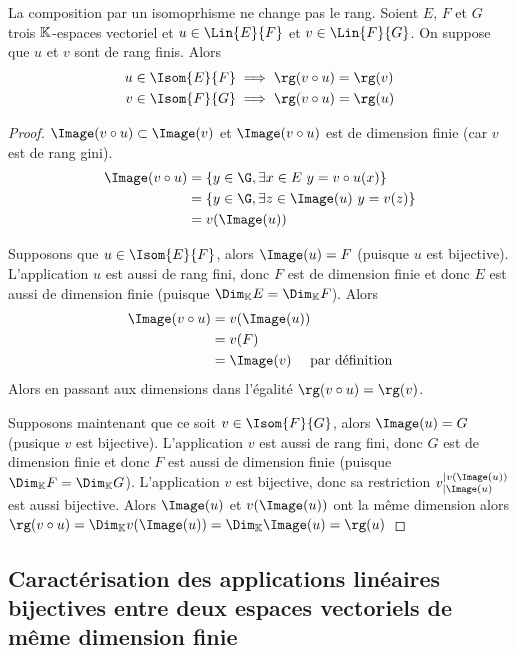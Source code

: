 \begin{theo}
  La composition par un isomoprhisme ne change pas le rang. Soient $E$, $F$ et $G$ trois $\mathbb{K}$-espaces vectoriel et $u \in \Lin{E}{F}$ et $v\in \Lin{F}{G}$. On suppose que $u$ et $v$ sont de rang finis. Alors
  \begin{align}
    u \in \Isom{E}{F} &\implies \rg(v \circ u)=\rg(v) \\
    v \in \Isom{F}{G} &\implies \rg(v \circ u)=\rg(u)
  \end{align}
\end{theo}
\begin{proof}
  $\Image(v \circ u) \subset \Image(v)$ et $\Image(v \circ u)$ est de dimension finie (car $v$ est de rang gini).
  \begin{align}
    \Image(v \circ u) &= \{y \in \G, \exists x \in E \ y=v \circ u(x) \}\\
    &=\{y \in \G, \exists z \in \Image(u) \ y=v(z)\}\\
    &=v(\Image(u))
  \end{align}

  Supposons que $u \in \Isom{E}{F}$, alors $\Image(u) = F$ (puisque $u$ est bijective). L'application $u$ est aussi de rang fini, donc $F$ est de dimension finie et donc $E$ est aussi de dimension finie (puisque $\Dim_\K E = \Dim_\K F$). Alors
  \begin{align}
    \Image(v \circ u) &= v(\Image(u)) \\
    &=v(F) \\
    &=\Image(v) \quad \text{~par définition}
  \end{align}
  Alors en passant aux dimensions dans l'égalité $\rg(v \circ u) = \rg(v)$.

  Supposons maintenant que ce soit $v \in \Isom{F}{G}$, alors $\Image(u) = G$ (pusique $v$ est bijective).  L'application $v$ est aussi de rang fini, donc $G$ est de dimension finie et donc $F$ est aussi de dimension finie (puisque $\Dim_\K F = \Dim_\K G$). L'application $v$ est bijective, donc sa restriction $v_{|\Image(u)}^{|v(\Image(u))}$ est aussi bijective. Alors $\Image(u)$ et $v(\Image(u))$ ont la même dimension alors $\rg(v \circ u) =\Dim_\K v(\Image(u))= \Dim_\K \Image(u) = \rg(u)$
\end{proof}

\subsection[Caractérisation des applications linéaires bijectives]{Caractérisation des applications linéaires bijectives entre deux espaces vectoriels de même dimension finie}

